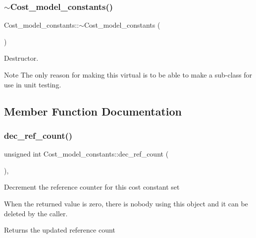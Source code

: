 \subsubsection{\texorpdfstring{$\sim$\+Cost\+\_\+model\+\_\+constants()}{~Cost\_model\_constants()}}
{\footnotesize\ttfamily Cost\+\_\+model\+\_\+constants\+::$\sim$\+Cost\+\_\+model\+\_\+constants (\begin{DoxyParamCaption}{ }\end{DoxyParamCaption})\hspace{0.3cm}{\ttfamily [virtual]}}

Destructor.

\begin{DoxyNote}{Note}
The only reason for making this virtual is to be able to make a sub-\/class for use in unit testing. 
\end{DoxyNote}


\subsection{Member Function Documentation}
\mbox{\label{classCost__model__constants_aafb2e930ad709e1f4f57bd7fb29cfee0}} 
\subsubsection{\texorpdfstring{dec\+\_\+ref\+\_\+count()}{dec\_ref\_count()}}
{\footnotesize\ttfamily unsigned int Cost\+\_\+model\+\_\+constants\+::dec\+\_\+ref\+\_\+count (\begin{DoxyParamCaption}{ }\end{DoxyParamCaption})\hspace{0.3cm}{\ttfamily [inline]}, {\ttfamily [protected]}}

Decrement the reference counter for this cost constant set

When the returned value is zero, there is nobody using this object and it can be deleted by the caller.

\begin{DoxyReturn}{Returns}
the updated reference count 
\end{DoxyReturn}
\mbox{\label{classCost__model__constants_a6b371182c2ed8f4b5e7e284ed88cb869}} 
